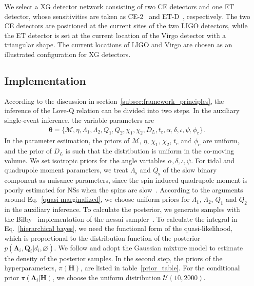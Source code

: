 \documentclass[a4paper,11pt]{article}
\begin{document}
We select a XG detector network consisting of two CE detectors and one ET 
detector, whose sensitivities are taken as CE-2~\cite{Reitze:2019iox,
Reitze:2019dyk} and ET-D~\cite{Punturo:2010zz, Hild:2010id,
Sathyaprakash:2012jk}, respectively. The two CE detectors are positioned at the
current sites of the two LIGO detectors, while the ET detector is set at the
current location of the Virgo detector with a triangular shape. 
The current locations of LIGO and Virgo are chosen as an illustrated configuration for XG detectors.

\subsection{Implementation}
\label{subsec:simulation_implementation}

According to the discussion in section~\ref{subsec:framework_principles}, the
inference of the Love-Q relation can be divided into two steps.  In the
auxiliary single-event inference, the variable parameters are 
\begin{align}
	\bm{\theta} = \{\mathcal{M},\eta, \Lambda_1,\Lambda_2,
	Q_1,Q_2,\chi_1,\chi_2, D_L,t_{c},\alpha, \delta,\iota,\psi,\phi_{c}\} \,.
\end{align}
In the parameter estimation, the priors of $\mathcal{M}$, $\eta$, $\chi_1$,
$\chi_2$, $t_{c}$ and $\phi_{c}$ are uniform, and the prior of $D_L$ is such
that the distribution is uniform in the co-moving volume. We set isotropic
priors for the angle variables $\alpha,\delta,\iota,\psi$. For tidal and
quadrupole moment parameters, we treat $\Lambda_{\mathrm{s}}$ and
$Q_{\mathrm{s}}$ of the slow binary component as nuisance parameters, since the
spin-induced quadrupole moment is poorly estimated for NSs when the spins are
slow~\cite{Yagi:2013awa}.  According to the arguments around
Eq.~\eqref{quasi-marginalized}, we choose uniform priors for $\Lambda_1$,
$\Lambda_2$, $Q_1$ and $Q_2$ in the auxiliary inference.  To calculate the
posterior, we generate samples with the {\sc Bilby}~\cite{Ashton:2018jfp}
implementation of the {\sc nessai} sampler~\cite{Skilling:2004pqw,
Skilling:2006gxv, michael_j_williams_2025_14627250, PhysRevD.103.103006,
Williams:2023ppp}.  To calculate the integral in Eq.~\eqref{hierarchical bayes},
we need the functional form of the quasi-likelihood, which is proportional to
the distribution function of the posterior $p(\bm{\Lambda}_i,
\bm{Q}_i|d_i,\varnothing)$. We follow \citet{Golomb:2021tll} and adopt the
Gaussian mixture model to estimate the density of the posterior samples.  In the
second step, the priors of the hyperparameters, $\pi(\bm{H})$, are listed in
table~\ref{prior_table}. For the conditional prior $\pi(\bm
{\Lambda}_i|\bm{H})$, we choose the uniform distribution $\mathcal{U}(10,2000)$.
\end{document}
